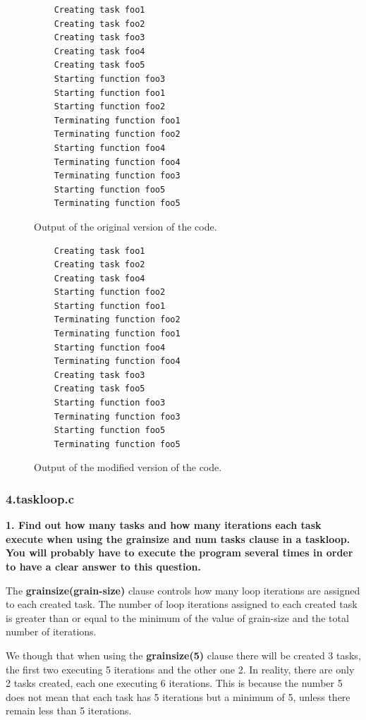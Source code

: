 \documentclass[12pt, a4paper]{article}
\begin{document}
\begin{figure}[H]
\begin{minipage}[b]{0.47\linewidth}

\begin{lstlisting}
	Creating task foo1
	Creating task foo2
	Creating task foo3
	Creating task foo4
	Creating task foo5
	Starting function foo3
	Starting function foo1
	Starting function foo2
	Terminating function foo1
	Terminating function foo2
	Starting function foo4
	Terminating function foo4
	Terminating function foo3
	Starting function foo5
	Terminating function foo5
\end{lstlisting}

\caption{Output of the original version of the code.}
\label{fig:original_code}
\end{minipage}
\hspace{0.5cm}
\begin{minipage}[b]{0.48\linewidth}

\begin{lstlisting}
	Creating task foo1
	Creating task foo2
	Creating task foo4
	Starting function foo2
	Starting function foo1
	Terminating function foo2
	Terminating function foo1
	Starting function foo4
	Terminating function foo4
	Creating task foo3
	Creating task foo5
	Starting function foo3
	Terminating function foo3
	Starting function foo5
	Terminating function foo5
\end{lstlisting}

\caption{Output of the modified version of the code.}
\label{fig:modified_code}
\end{minipage}
\end{figure}

\subsubsection{4.taskloop.c}

\textbf{1. Find out how many tasks and how many iterations each task execute when using the grainsize and num tasks clause in a taskloop. You will probably have to execute the program several times in order to have a clear answer to this question.}

The \textbf{grainsize(grain-size)} clause controls how many loop iterations are assigned to each created task. The number of loop iterations assigned to each created task is greater than or equal to the minimum of the value of grain-size and the total number of iterations.

We though that when using the \textbf{grainsize(5)} clause there will be created 3 tasks, the first two executing 5 iterations and the other one 2. In reality, there are only 2 tasks created, each one executing 6 iterations. This is because the number 5 does not mean that each task has 5 iterations but a minimum of 5, unless there remain less than 5 iterations.
\end{document}
